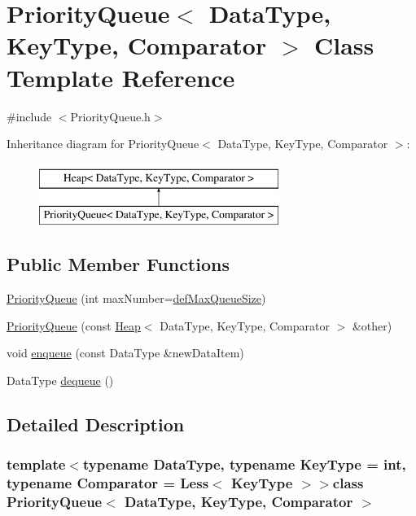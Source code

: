 \hypertarget{class_priority_queue}{\section{\-Priority\-Queue$<$ \-Data\-Type, \-Key\-Type, \-Comparator $>$ \-Class \-Template \-Reference}
\label{class_priority_queue}
}


{\ttfamily \#include $<$\-Priority\-Queue.\-h$>$}

\-Inheritance diagram for \-Priority\-Queue$<$ \-Data\-Type, \-Key\-Type, \-Comparator $>$\-:\begin{figure}[H]
\begin{center}
\leavevmode
\includegraphics[height=2.000000cm]{class_priority_queue}
\end{center}
\end{figure}
\subsection*{\-Public \-Member \-Functions}
\begin{DoxyCompactItemize}
\item 
\hyperlink{class_priority_queue_a47de2a46cff1d6a6ed30a99c94dc1b14}{\-Priority\-Queue} (int max\-Number=\hyperlink{_priority_queue_8h_a88703212007be018800be64f2f5fde2f}{def\-Max\-Queue\-Size})
\item 
\hyperlink{class_priority_queue_ab3b8c46007394fe44868b316ec157b92}{\-Priority\-Queue} (const \hyperlink{class_heap}{\-Heap}$<$ \-Data\-Type, \-Key\-Type, \-Comparator $>$ \&other)
\item 
void \hyperlink{class_priority_queue_a61f3339cf0e87c67ed004f8eff0a1bfa}{enqueue} (const \-Data\-Type \&new\-Data\-Item)
\item 
\-Data\-Type \hyperlink{class_priority_queue_a5bc758e313d6244e672ea6e81d695a46}{dequeue} ()
\end{DoxyCompactItemize}


\subsection{\-Detailed \-Description}
\subsubsection*{template$<$typename Data\-Type, typename Key\-Type = int, typename Comparator = \-Less$<$ Key\-Type $>$$>$class Priority\-Queue$<$ Data\-Type, Key\-Type, Comparator $>$}


